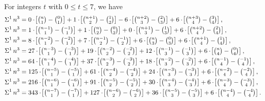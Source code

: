 \begin{example}
  For integers $t$ with $0 \le t \le 7$, we have
  \begin{align*}
    \KnuthRFoldSum{1}{n}{3}
    &= 0 \cdot \!\left[\tbinom{n}{1}-\tbinom{0}{1}\right]
    + 1 \cdot \!\left[\tbinom{n+1}{2}-\tbinom{1}{2}\right]
    - 6 \cdot \!\left[\tbinom{n+2}{3}-\tbinom{2}{3}\right]
    + 6 \cdot \!\left[\tbinom{n+3}{4}-\tbinom{3}{4}\right], \\
    \KnuthRFoldSum{1}{n}{3}
    &= 1 \cdot \!\left[\tbinom{n-1}{1}-\tbinom{-1}{1}\right]
    + 1 \cdot \!\left[\tbinom{n}{2}-\tbinom{0}{2}\right]
    + 0 \cdot \!\left[\tbinom{n+1}{3}-\tbinom{1}{3}\right]
    + 6 \cdot \!\left[\tbinom{n+2}{4}-\tbinom{2}{4}\right], \\
    \KnuthRFoldSum{1}{n}{3}
    &= 8 \cdot \!\left[\tbinom{n-2}{1}-\tbinom{-2}{1}\right]
    + 7 \cdot \!\left[\tbinom{n-1}{2}-\tbinom{-1}{2}\right]
    + 6 \cdot \!\left[\tbinom{n}{3}-\tbinom{0}{3}\right]
    + 6 \cdot \!\left[\tbinom{n+1}{4}-\tbinom{1}{4}\right], \\
    \KnuthRFoldSum{1}{n}{3}
    &= 27 \cdot \!\left[\tbinom{n-3}{1}-\tbinom{-3}{1}\right]
    + 19 \cdot \!\left[\tbinom{n-2}{2}-\tbinom{-2}{2}\right]
    + 12 \cdot \!\left[\tbinom{n-1}{3}-\tbinom{-1}{3}\right]
    + 6 \cdot \!\left[\tbinom{n}{4}-\tbinom{0}{4}\right], \\
    \KnuthRFoldSum{1}{n}{3}
    &= 64 \cdot \!\left[\tbinom{n-4}{1}-\tbinom{-4}{1}\right]
    + 37 \cdot \!\left[\tbinom{n-3}{2}-\tbinom{-3}{2}\right]
    + 18 \cdot \!\left[\tbinom{n-2}{3}-\tbinom{-2}{3}\right]
    + 6 \cdot \!\left[\tbinom{n-1}{4}-\tbinom{-1}{4}\right], \\
    \KnuthRFoldSum{1}{n}{3}
    &= 125 \cdot \!\left[\tbinom{n-5}{1}-\tbinom{-5}{1}\right]
    + 61 \cdot \!\left[\tbinom{n-4}{2}-\tbinom{-4}{2}\right]
    + 24 \cdot \!\left[\tbinom{n-3}{3}-\tbinom{-3}{3}\right]
    + 6 \cdot \!\left[\tbinom{n-2}{4}-\tbinom{-2}{4}\right], \\
    \KnuthRFoldSum{1}{n}{3}
    &= 216 \cdot \!\left[\tbinom{n-6}{1}-\tbinom{-6}{1}\right]
    + 91 \cdot \!\left[\tbinom{n-5}{2}-\tbinom{-5}{2}\right]
    + 30 \cdot \!\left[\tbinom{n-4}{3}-\tbinom{-4}{3}\right]
    + 6 \cdot \!\left[\tbinom{n-3}{4}-\tbinom{-3}{4}\right], \\
    \KnuthRFoldSum{1}{n}{3}
    &= 343 \cdot \!\left[\tbinom{n-7}{1}-\tbinom{-7}{1}\right]
    + 127 \cdot \!\left[\tbinom{n-6}{2}-\tbinom{-6}{2}\right]
    + 36 \cdot \!\left[\tbinom{n-5}{3}-\tbinom{-5}{3}\right]
    + 6 \cdot \!\left[\tbinom{n-4}{4}-\tbinom{-4}{4}\right].
  \end{align*}
\end{example}
